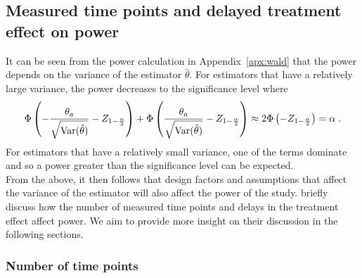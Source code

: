 \documentclass[10pt]{article}
\begin{document}
\subsection{Measured time points and delayed treatment effect on power} \label{apx:power}

It can be seen from the power calculation in Appendix~\ref{apx:wald} that the power depends on the variance of the estimator $\hat{\theta}$. For estimators that have a relatively large variance, the power decreases to the significance level where
\[
\Phi\left(-\frac{\theta_a}{\sqrt{\mathrm{Var}(\hat{\theta})}}-Z_{1-\frac{\alpha}{2}}\right) + \Phi\left(\frac{\theta_a}{\sqrt{\mathrm{Var}(\hat{\theta})}} - Z_{1-\frac{\alpha}{2}}\right) \approx 2\Phi\left(-Z_{1-\frac{\alpha}{2}}\right) = \alpha \;.
\]
For estimators that have a relatively small variance, one of the terms dominate and so a power greater than the significance level can be expected.
\\

From the above, it then follows that design factors and assumptions that affect the variance of the estimator will also affect the power of the study. \textcite{Hussey:2007} briefly discuss how the number of measured time points and delays in the treatment effect affect power. We aim to provide more insight on their discussion in the following sections.

\subsubsection{Number of time points}
\end{document}
